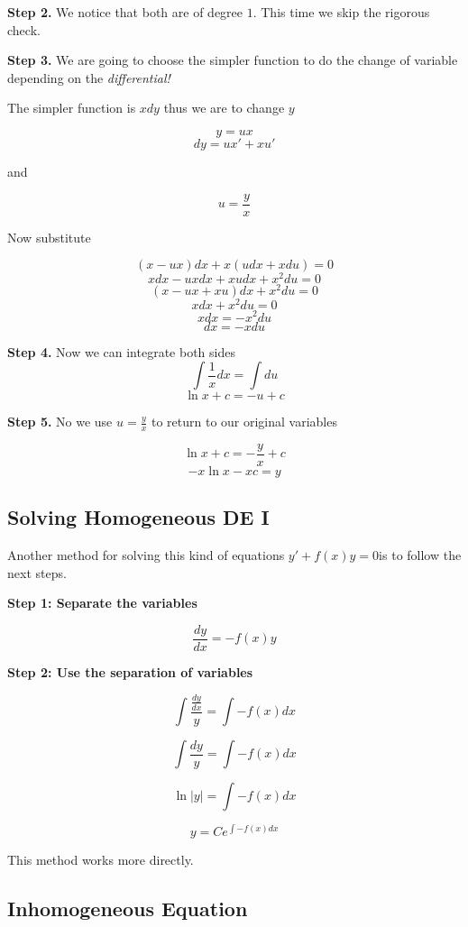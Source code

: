 \textbf{Step 2.} We notice that both are of degree \(1\). This time we skip the rigorous check.
\vspace{\baselineskip}

\textbf{Step 3.} We are going to choose the simpler function to do the change of variable 
depending on the \emph{differential!} 
\vspace{\baselineskip}

The simpler function is \(xdy\) thus we are to change \(y\)

\[y = ux\]
\[dy = ux' + xu'\]

and 

\[u = \frac{y}{x}\]

Now substitute

\[(x - ux)dx + x(udx + xdu) = 0\]
\[xdx - u x dx + x u dx + x^{2}du = 0\]
\[(x - ux + xu)dx + x^{2}du = 0\]
\[xdx + x^{2}du = 0\]
\[xdx = - x^{2}du\]
\[dx = - xdu\]

\textbf{Step 4.} Now we can integrate both sides
\[\int \frac{1}{x}dx = \int du\]
\[\ln x + c = -u + c\]

\textbf{Step 5.} No we use \(u = \frac{y}{x}\) to return to our original variables

\[\ln x + c = -\frac{y}{x} + c\]
\[-x\ln x - xc = y\]


\subsection{Solving Homogeneous DE I}

Another method for solving this kind of equations \(y' + f(x)y = 0\)is to follow the next steps.
\vspace{\baselineskip}

\textbf{Step 1: Separate the variables}

\[
\frac{dy}{dx} = -f(x)y
\]

\textbf{Step 2: Use the separation of variables}

\[
\int \frac{\frac{dy}{dx}}{y} = \int -f(x) dx
\]

\[
\int \frac{dy}{y} = \int -f(x) dx
\]

\[
    \ln|y| = \int -f(x) dx
\]

\[
    y = C e^{\int -f(x) dx}
\]

This method works more directly.

\subsection{Inhomogeneous Equation}

